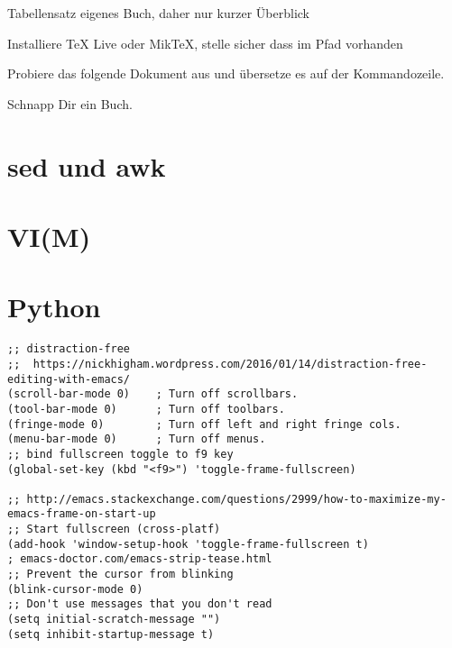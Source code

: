 \documentclass[12pt,ngerman]{scrbook}
\begin{document}
Tabellensatz eigenes Buch, daher nur kurzer Überblick

Installiere TeX Live oder MikTeX, stelle sicher dass im Pfad vorhanden

Probiere das folgende Dokument aus und übersetze es auf der Kommandozeile.

Schnapp Dir ein Buch.

\section{sed und awk}

\section{VI(M)}



\section{Python}

\backmatter

\blindtext

\begin{lstlisting}[basicstyle=\ttfamily] % <--- here
;; distraction-free
;;  https://nickhigham.wordpress.com/2016/01/14/distraction-free-editing-with-emacs/
(scroll-bar-mode 0)    ; Turn off scrollbars.
(tool-bar-mode 0)      ; Turn off toolbars.
(fringe-mode 0)        ; Turn off left and right fringe cols.
(menu-bar-mode 0)      ; Turn off menus.
;; bind fullscreen toggle to f9 key
(global-set-key (kbd "<f9>") 'toggle-frame-fullscreen)

;; http://emacs.stackexchange.com/questions/2999/how-to-maximize-my-emacs-frame-on-start-up
;; Start fullscreen (cross-platf)
(add-hook 'window-setup-hook 'toggle-frame-fullscreen t)
; emacs-doctor.com/emacs-strip-tease.html
;; Prevent the cursor from blinking
(blink-cursor-mode 0)
;; Don't use messages that you don't read
(setq initial-scratch-message "")
(setq inhibit-startup-message t)
\end{lstlisting}

\nocite{*}

\printbibliography 
\end{document}
